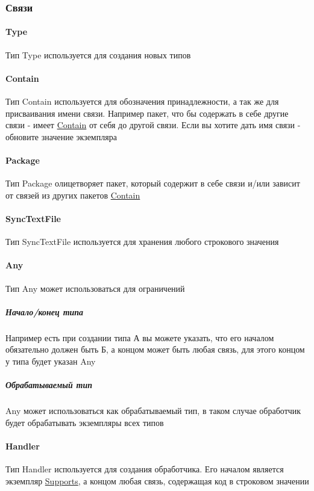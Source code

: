 \documentclass{article}
\begin{document}
\subsubsection{Связи}
\paragraph*{Type}\hypertarget{Core.Type.Description}{}
Тип Type используется для создания новых типов
\paragraph*{Contain}\hypertarget{Core.Contain.Description}{}
Тип Contain используется для обозначения
принадлежности, а так же для присваивания имени связи. Например пакет, что бы
содержать в себе другие связи - имеет \hyperlink{Core.Contain.Description}{Contain} от себя
до другой связи. Если вы хотите дать имя связи - обновите значение экземпляра
\paragraph*{Package}\hypertarget{Core.Package.Description}{}
Тип Package олицетворяет пакет, который содержит в себе связи и/или зависит от связей из других пакетов
\hyperlink{Core.Contain.Description}{Contain}
\paragraph*{SyncTextFile}\hypertarget{Core.SyncTextFile.Description}{}
Тип SyncTextFile используется для хранения
любого строкового значения
\paragraph*{Any}\hypertarget{Core.Any.Description}{}
Тип Any может использоваться для ограничений
\subparagraph*{Начало/конец типа}
Например есть при создании типа А вы можете указать, что его началом
обязательно должен быть Б, а концом может быть любая связь, для этого концом у
типа будет указан Any
\subparagraph*{Обрабатываемый тип}
Any может использоваться как обрабатываемый тип, в таком случае обработчик
будет обрабатывать экземпляры всех типов
\paragraph*{Handler}\hypertarget{Core.Handler.Description}{}
Тип Handler используется для создания обработчика.
Его началом является экземпляр \hyperlink{supports.Description}{Supports}, а концом
любая связь, содержащая код в строковом значении
\end{document}
